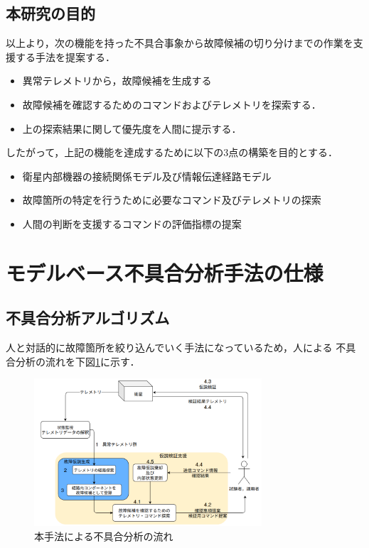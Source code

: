 \documentclass[11pt]{jsarticle}%
\begin{document}
\begin{multicols}{2}
\subsection{本研究の目的}
以上より，次の機能を持った不具合事象から故障候補の切り分けまでの作業を支援する手法を提案する．
  \begin{itemize}
  \item 異常テレメトリから，故障候補を生成する
  \item 故障候補を確認するためのコマンドおよびテレメトリを探索する．
  \item 上の探索結果に関して優先度を人間に提示する．
\end{itemize}
したがって，上記の機能を達成するために以下の3点の構築を目的とする．%
\begin{itemize}
  \item 衛星内部機器の接続関係モデル及び情報伝達経路モデル
  \item 故障箇所の特定を行うために必要なコマンド及びテレメトリの探索
  \item 人間の判断を支援するコマンドの評価指標の提案
\end{itemize}
\vspace{-1zh}
\section{モデルベース不具合分析手法の仕様}
\vspace{-1zh}
\subsection{不具合分析アルゴリズム}
\vspace{-1zh}
人と対話的に故障箇所を絞り込んでいく手法になっているため，人による
不具合分析の流れを下図\ref{fig:fault_diagnosis_flow}に示す．
\begin{figure}[H]
  \centering
    \includegraphics[height=5.5cm]{../figure/fault_diagnosis_flow.png}
    \caption{本手法による不具合分析の流れ}
    \label{fig:fault_diagnosis_flow}
\end{figure}


\end{multicols}
\end{document}
